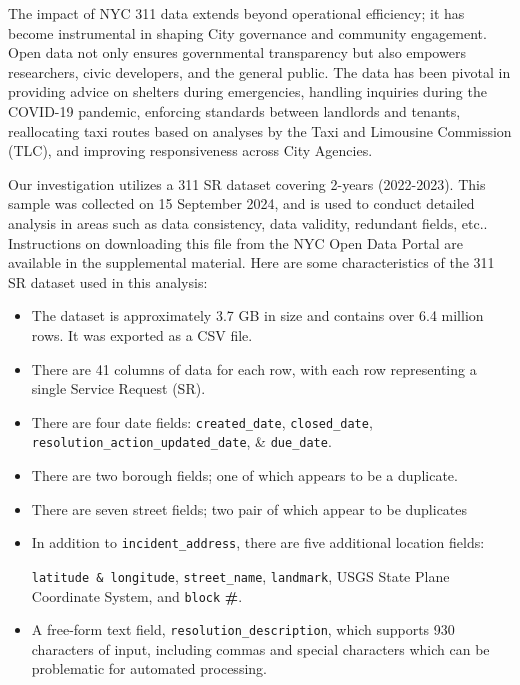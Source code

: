 \documentclass[linenumber]{jdsart}
\begin{document}
The impact of NYC 311 data extends beyond operational efficiency; it
has become instrumental in shaping City governance and community
engagement. Open data not only ensures governmental transparency
but also empowers researchers, civic developers, and the general
public. The data has been pivotal in providing advice on shelters
during emergencies, handling inquiries during the COVID\mbox{-}19 pandemic,
enforcing standards between landlords and tenants, reallocating taxi
routes based on analyses by the Taxi and Limousine Commission (TLC),
and improving responsiveness across City Agencies.


Our investigation utilizes a 311 SR dataset covering  2\mbox{-}years (2022-2023).
 This sample was collected on 15 September 2024, and is used 
 to conduct detailed analysis in areas such as data 
 consistency, data validity, redundant fields, etc.. Instructions 
 on downloading this file from the NYC Open Data Portal 
 are available in the supplemental material. Here are some 
 characteristics of the 311 SR dataset used in this analysis:

\begin{itemize}[left=1.5em]
	\item The dataset is approximately 3.7 GB in size and contains 
	over 6.4 million rows. It was exported as a CSV file.

	\item There are 41 columns of data for each row, with each
	row representing a single Service Request (SR). 
	
	\item There are four date fields: \texttt{created\_date}, \texttt{closed\_date}, 
	\texttt{resolution\_action\_updated\_date}, \& \texttt{due\_date}.
	
	\item There are two borough fields; one of which appears to be a duplicate.
		
	\item There are seven street fields; two pair of which appear to be duplicates
	
	\item In addition to  \texttt{incident\_address}, there are five additional location fields: 

	\texttt{latitude \& longitude}, \texttt{street\_name}, \texttt{landmark}, USGS State Plane 
	Coordinate System, and \texttt{block} \textbf{\#}.
	
	\item A free\mbox{-}form text field, \texttt{resolution\_description}, which 
	supports 930 characters of input, including commas and 
	special characters  which can be problematic for automated processing.
\end{itemize}
\end{document}
